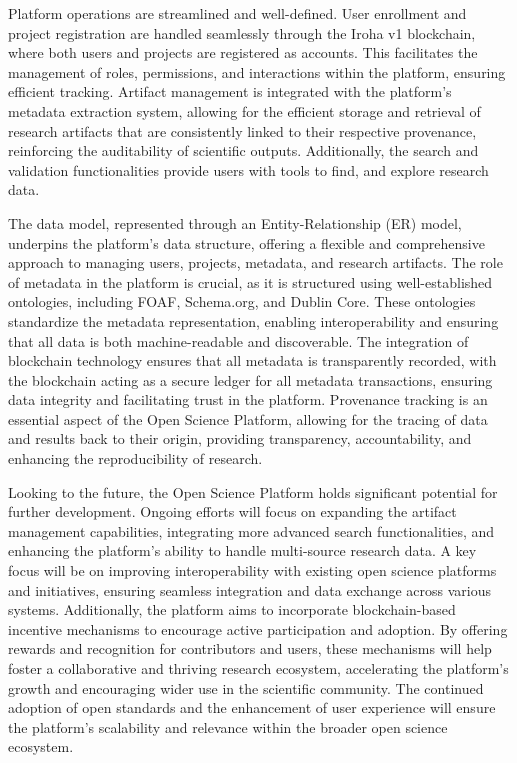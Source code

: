 \documentclass[final]{rc-book-2.14}
\begin{document}
Platform operations are streamlined and well-defined. User enrollment and project registration are handled seamlessly through the Iroha v1 blockchain, where both users and projects are registered as accounts. This facilitates the management of roles, permissions, and interactions within the platform, ensuring efficient tracking. Artifact management is integrated with the platform's metadata extraction system, allowing for the efficient storage and retrieval of research artifacts that are consistently linked to their respective provenance, reinforcing the auditability of scientific outputs. Additionally, the search and validation functionalities provide users with tools to find, and explore research data.

The data model, represented through an Entity-Relationship (ER) model, underpins the platform's data structure, offering a flexible and comprehensive approach to managing users, projects, metadata, and research artifacts. The role of metadata in the platform is crucial, as it is structured using well-established ontologies, including FOAF, Schema.org, and Dublin Core. These ontologies standardize the metadata representation, enabling interoperability and ensuring that all data is both machine-readable and discoverable. The integration of blockchain technology ensures that all metadata is transparently recorded, with the blockchain acting as a secure ledger for all metadata transactions, ensuring data integrity and facilitating trust in the platform. Provenance tracking is an essential aspect of the Open Science Platform, allowing for the tracing of data and results back to their origin, providing transparency, accountability, and enhancing the reproducibility of research.

Looking to the future, the Open Science Platform holds significant potential for further development. Ongoing efforts will focus on expanding the artifact management capabilities, integrating more advanced search functionalities, and enhancing the platform’s ability to handle multi-source research data. A key focus will be on improving interoperability with existing open science platforms and initiatives, ensuring seamless integration and data exchange across various systems. Additionally, the platform aims to incorporate blockchain-based incentive mechanisms to encourage active participation and adoption. By offering rewards and recognition for contributors and users, these mechanisms will help foster a collaborative and thriving research ecosystem, accelerating the platform's growth and encouraging wider use in the scientific community. The continued adoption of open standards and the enhancement of user experience will ensure the platform’s scalability and relevance within the broader open science ecosystem.
\end{document}
